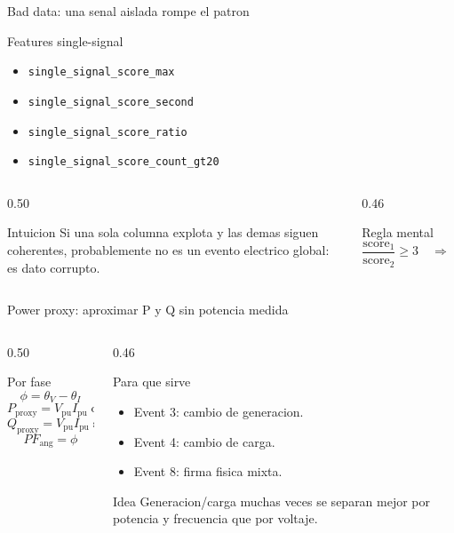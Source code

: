\documentclass[10pt,aspectratio=169]{beamer}
\newcommand{\code}[1]{\texttt{\footnotesize #1}}
\begin{document}
\begin{frame}{Bad data: una senal aislada rompe el patron}
\small
\begin{block}{Features single-signal}
\begin{itemize}
  \item \code{single\_signal\_score\_max}
  \item \code{single\_signal\_score\_second}
  \item \code{single\_signal\_score\_ratio}
  \item \code{single\_signal\_score\_count\_gt20}
\end{itemize}
\end{block}
\begin{columns}[T,totalwidth=\textwidth]
\begin{column}{0.50\textwidth}
\begin{exampleblock}{Intuicion}
Si una sola columna explota y las demas siguen coherentes, probablemente no es un evento electrico global: es dato corrupto.
\end{exampleblock}
\end{column}
\begin{column}{0.46\textwidth}
\begin{alertblock}{Regla mental}
\[
\frac{\mathrm{score}_{1}}{\mathrm{score}_{2}} \geq 3
\quad\Rightarrow\quad
\mathrm{bad\ data\ candidate}
\]
\end{alertblock}
\end{column}
\end{columns}
\end{frame}

\begin{frame}{Power proxy: aproximar P y Q sin potencia medida}
\small
\begin{columns}[T,totalwidth=\textwidth]
\begin{column}{0.50\textwidth}
\begin{block}{Por fase}
\[
\phi = \theta_V - \theta_I
\]
\[
P_{\mathrm{proxy}} = V_{\mathrm{pu}} I_{\mathrm{pu}} \cos(\phi)
\]
\[
Q_{\mathrm{proxy}} = V_{\mathrm{pu}} I_{\mathrm{pu}} \sin(\phi)
\]
\[
PF_{\mathrm{ang}} = \phi
\]
\end{block}
\end{column}
\begin{column}{0.46\textwidth}
\begin{exampleblock}{Para que sirve}
\begin{itemize}
  \item Event 3: cambio de generacion.
  \item Event 4: cambio de carga.
  \item Event 8: firma fisica mixta.
\end{itemize}
\end{exampleblock}
\begin{alertblock}{Idea}
Generacion/carga muchas veces se separan mejor por potencia y frecuencia que por voltaje.
\end{alertblock}
\end{column}
\end{columns}
\end{frame}
\end{document}
